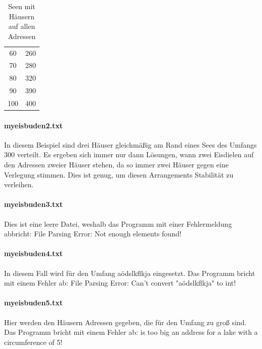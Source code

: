\documentclass[a4paper,10pt,ngerman,captions=figureheading]{scrartcl}
\begin{document}
\begin{table}[h!t]
\begin{center}
\begin{tabularx}{\linewidth}{c|c}
            60              & 260                                  \\
            70              & 280                                  \\
            80              & 320                                  \\
            90              & 390                                  \\
            100             & 400
        \end{tabularx}
        \caption{Seen mit Häusern auf allen Adressen}
        \label{tab:Häuser_auf_allen_Adressen}
    \end{center}
\end{table}

\paragraph{myeisbuden2.txt}
In diesem Beispiel sind drei Häuser gleichmäßig am Rand eines Sees des Umfangs $300$ verteilt.
Es ergeben sich immer nur dann Lösungen, wann zwei Eisdielen auf den Adressen zweier Häuser stehen, da so immer zwei Häuser gegen eine Verlegung stimmen.
Dies ist genug, um diesen Arrangements Stabilität zu verleihen.

\paragraph{myeisbuden3.txt}
Dies ist eine leere Datei, weshalb das Programm mit einer Fehlermeldung abbricht: \glqq File Parsing Error: Not enough elements found!\grqq{}

\paragraph{myeisbuden4.txt}
In diesem Fall wird für den Umfang \glqq aödslkflkja\grqq{} eingesetzt.
Das Programm bricht mit einem Fehler ab: \glqq File Parsing Error: Can't convert "aödslkflkja" to int!\grqq{}

\paragraph{myeisbuden5.txt}
Hier werden den Häusern Adressen gegeben, die für den Umfang zu groß sind.
Das Programm bricht mit einem Fehler ab:  is too big an address for a lake with a circumference of 5!\grqq{}
\end{document}
